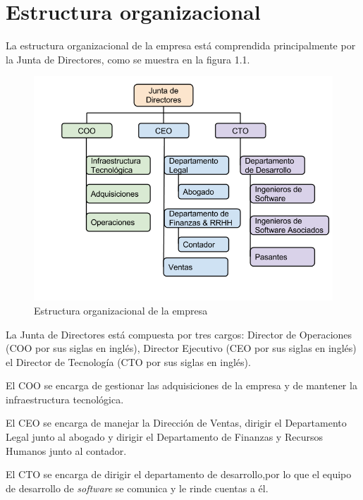 \section{Estructura organizacional} \label{Estuctura organizacional}

La estructura organizacional de la empresa está comprendida principalmente por la Junta de Directores, como se muestra en la figura 1.1.

\begin{figure}[ht]
  \centering
  \includegraphics[scale=0.45,type=png,ext=.png,read=.png]{imagenes/estructura_empresa}
  \caption{Estructura organizacional de la empresa}
  \label{fig:estructuraEmpresa}
\end{figure}

La Junta de Directores está compuesta por tres cargos: Director de Operaciones (COO por sus siglas en inglés), Director Ejecutivo (CEO por sus siglas en inglés) el Director de Tecnología (CTO por sus siglas en inglés).

El COO se encarga de gestionar las adquisiciones de la empresa y de mantener la infraestructura tecnológica.

El CEO se encarga de manejar la Dirección de Ventas, dirigir el Departamento Legal junto al abogado y dirigir el Departamento de Finanzas y Recursos Humanos junto al contador.

El CTO se encarga de dirigir el departamento de desarrollo,por lo que el equipo de desarrollo de \textit{software} se comunica y le rinde cuentas a él.


